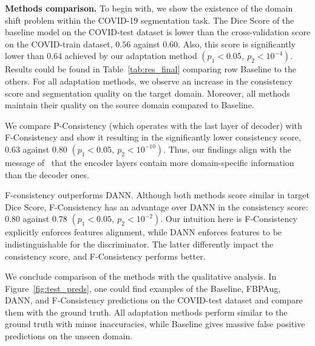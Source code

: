 \textbf{Methods comparison.} To begin with, we show the existence of the domain shift problem within the COVID-19 segmentation task. The Dice Score of the baseline model on the COVID-test dataset is lower than the cross-validation score on the COVID-train dataset, $0.56$ against $0.60$. Also, this score is significantly lower than $0.64$ achieved by our adaptation method $\left(p_1 < 0.05,\: p_2 < 10^{-4} \right)$. Results could be found in Table~\ref{tab:res_final} comparing row Baseline to the others. For all adaptation methods, we observe an increase in the consistency score and segmentation quality on the target domain. Moreover, all methods maintain their quality on the source domain compared to Baseline.




We compare P-Consistency (which operates with the last layer of decoder) with F-Consistency and show it resulting in the significantly lower consistency score, $0.63$ against $0.80$ $\left(p_1 < 0.05,\: p_2 < 10^{-10}\right)$. Thus, our findings align with the message of~\cite{zakazov2021anatomy} that the encoder layers contain more domain-specific information than the decoder ones.

F-consistency outperforms DANN. Although both methods score similar in target Dice Score, F-Consistency has an advantage over DANN in the consistency score: $0.80$ against $0.78$ $\left(p_1 < 0.05,\: p_2 < 10^{-2}\right)$. Our intuition here is F-Consistency explicitly enforces features alignment, while DANN enforces features to be indistinguishable for the discriminator. The latter differently impact the consistency score, and F-Consistency performs better.

We conclude comparison of the methods with the qualitative analysis. In Figure~\ref{fig:test_preds}, one could find examples of the Baseline, FBPAug, DANN, and F-Consistency predictions on the COVID-test dataset and compare them with the ground truth. All adaptation methods perform similar to the ground truth with minor inaccuracies, while Baseline gives massive false positive predictions on the unseen domain.%

